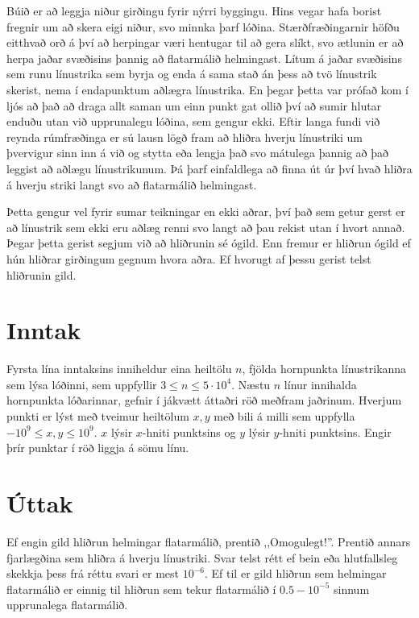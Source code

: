 
Búið er að leggja niður girðingu fyrir nýrri byggingu. Hins vegar hafa borist fregnir um að skera eigi niður, svo minnka
þarf lóðina. Stærðfræðingarnir höfðu eitthvað orð á því að herpingar væri hentugar til að gera slíkt, svo ætlunin er að
herpa jaðar svæðisins þannig að flatarmálið helmingast. Lítum á jaðar svæðisins sem runu línustrika sem byrja og enda á
sama stað án þess að tvö línustrik skerist, nema í endapunktum aðlægra línustrika. En þegar þetta var prófað kom í ljós
að það að draga allt saman um einn punkt gat ollið því að sumir hlutar enduðu utan við upprunalegu lóðina, sem gengur
ekki. Eftir langa fundi við reynda rúmfræðinga er sú lausn lögð fram að hliðra hverju línustriki um þvervigur sinn inn
á við og stytta eða lengja það svo mátulega þannig að það leggist að aðlægu línustrikunum. Þá þarf einfaldlega að finna
út úr því hvað hliðra á hverju striki langt svo að flatarmálið helmingast.

Þetta gengur vel fyrir sumar teikningar en ekki aðrar, því það sem getur gerst er að línustrik sem ekki eru aðlæg renni
svo langt að þau rekist utan í hvort annað. Þegar þetta gerist segjum við að hliðrunin sé ógild. Enn fremur er hliðrun
ógild ef hún hliðrar girðingum gegnum hvora aðra. Ef hvorugt af þessu gerist telst hliðrunin gild.

\section*{Inntak}
Fyrsta lína inntaksins inniheldur eina heiltölu $n$, fjölda hornpunkta línustrikanna sem lýsa lóðinni, sem uppfyllir
$3 \leq n \leq 5 \cdot 10^4$.
Næstu $n$ línur innihalda hornpunkta lóðarinnar, gefnir í jákvætt áttaðri röð meðfram jaðrinum. Hverjum punkti er lýst
með tveimur heiltölum $x, y$ með bili á milli sem uppfylla $-10^9 \leq x, y \leq 10^9$. $x$ lýsir $x$-hniti punktsins
og $y$ lýsir $y$-hniti punktsins. Engir þrír punktar í röð liggja á sömu línu.

\section*{Úttak}
Ef engin gild hliðrun helmingar flatarmálið, prentið ,,Omogulegt!''. Prentið annars fjarlægðina sem hliðra á hverju
línustriki. Svar telst rétt ef bein eða hlutfallsleg skekkja þess frá réttu svari er mest $10^{-6}$. Ef til er gild hliðrun
sem helmingar flatarmálið er einnig til hliðrun sem tekur flatarmálið í $0.5 - 10^{-5}$ sinnum upprunalega flatarmálið.

